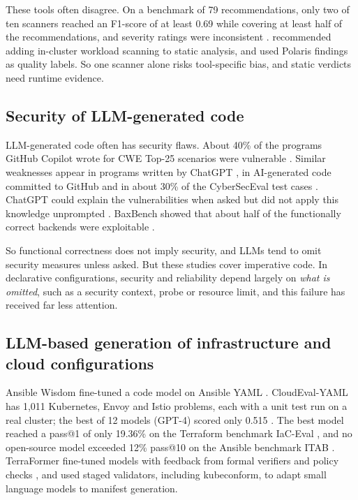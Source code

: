 These tools often disagree. On a benchmark of 79 recommendations, only two of ten scanners reached an F1-score of at least 0.69 while covering at least half of the recommendations, and severity ratings were inconsistent \citep{krieger2026k8sscanners}. \citet{kapetanidou2025k8sscanning} recommended adding in-cluster workload scanning to static analysis, and \citet{lanciano2023declarative} used Polaris findings as quality labels. So one scanner alone risks tool-specific bias, and static verdicts need runtime evidence.

\subsection{Security of LLM-generated code}\label{sec:lit-llmcode}

LLM-generated code often has security flaws. About 40\% of the programs GitHub Copilot wrote for CWE Top-25 scenarios were vulnerable \citep{pearce2022asleep}. Similar weaknesses appear in programs written by ChatGPT \citep{khoury2023chatgptsecure}, in AI-generated code committed to GitHub \citep{fu2025copilotweaknesses} and in about 30\% of the CyberSecEval test cases \citep{bhatt2023cyberseceval}. ChatGPT could explain the vulnerabilities when asked but did not apply this knowledge unprompted \citep{khoury2023chatgptsecure}. BaxBench showed that about half of the functionally correct backends were exploitable \citep{vero2025baxbench}.

So functional correctness does not imply security, and LLMs tend to omit security measures unless asked. But these studies cover imperative code. In declarative configurations, security and reliability depend largely on \emph{what is omitted}, such as a security context, probe or resource limit, and this failure has received far less attention.

\subsection{LLM-based generation of infrastructure and cloud configurations}\label{sec:lit-iac}

Ansible Wisdom fine-tuned a code model on Ansible YAML \citep{pujar2023ansiblewisdom}. CloudEval-YAML has 1,011 Kubernetes, Envoy and Istio problems, each with a unit test run on a real cluster; the best of 12 models (GPT-4) scored only 0.515 \citep{xu2024cloudevalyaml}. The best model reached a pass@1 of only 19.36\% on the Terraform benchmark IaC-Eval \citep{kon2024iaceval}, and no open-source model exceeded 12\% pass@10 on the Ansible benchmark ITAB \citep{hassan2026itab}. TerraFormer fine-tuned models with feedback from formal verifiers and policy checks \citep{jana2026terraformer}, and \citet{kozachok2026k8sdistillation} used staged validators, including kubeconform, to adapt small language models to manifest generation.

